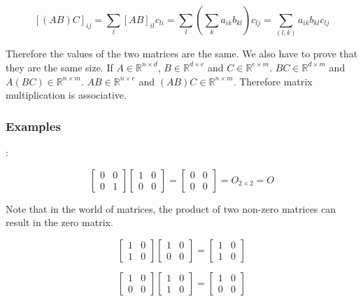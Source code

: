 \documentclass[11 pt, twoside]{article}
\begin{document}
$$[(AB)C]_{ij} = \sum_l [AB]_{il} c_{li} = \sum_l(\sum_k a_{ik} b_{kl})c_{lj} =
\sum_{(l, k)} a_{ik} b_{kl} c_{lj}$$

Therefore the values of the two matrices are the same. We also have to prove
that they are the same size. If $A \in \mathbb{R}^{n \times d}$, $B \in
\mathbb{R}^{d \times e}$ and $C \in \mathbb{R}^{e \times m}$. $BC \in
\mathbb{R}^{d \times m}$ and $A(BC) \in \mathbb{R}^{n \times m}$. $AB \in
\mathbb{R}^{n \times e}$ and $(AB)C \in \mathbb{R}^{n \times m}$.
Therefore matrix multiplication is associative.

\subsubsection{Examples}:

\[
\left[\begin{array}{cc}
0 & 0 \\
0 & 1
\end{array}\right]
\left[\begin{array}{cc}
1 & 0 \\
0 & 0
\end{array}\right]
=
\left[\begin{array}{cc}
0 & 0 \\
0 & 0
\end{array}\right]
= O_{2 \times 2}
= O
\]

Note that in the world of matrices, the product of two non-zero matrices can
result in the zero matrix.

\[
\left[\begin{array}{cc}
1 & 0 \\
1 & 0
\end{array}\right]
\left[\begin{array}{cc}
1 & 0 \\
0 & 0
\end{array}\right]
=
\left[\begin{array}{cc}
1 & 0 \\
1 & 0
\end{array}\right]
\]

\[
\left[\begin{array}{cc}
1 & 0 \\
0 & 0
\end{array}\right]
\left[\begin{array}{cc}
1 & 0 \\
1 & 0
\end{array}\right]
=
\left[\begin{array}{cc}
1 & 0 \\
0 & 0
\end{array}\right]
\]
\end{document}
